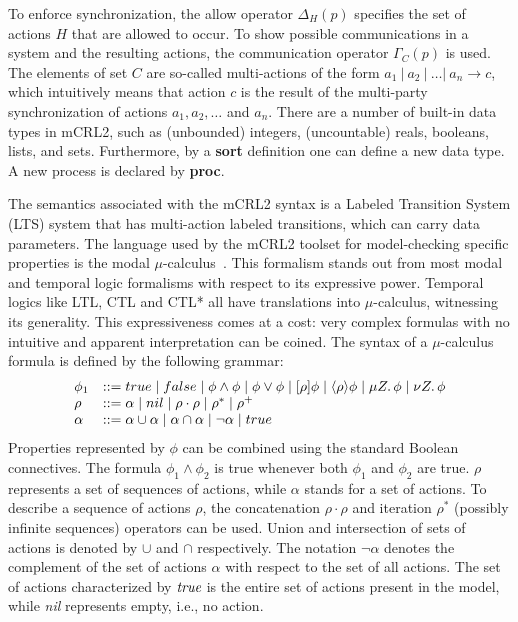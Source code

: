 \documentclass[letter]{llncs}
\begin{document}
To enforce synchronization, the allow operator ${\Delta_H(p)}$ specifies the set of actions $H$ that are allowed
to occur. To show possible communications in a system and the resulting actions, the communication operator
${\Gamma_C(p)}$ is used. The elements of set $C$ are so-called multi-actions of the form $a_1\ |\ a_2\ |\ \dots |\ a_n \rightarrow c$, which intuitively
means that action $c$ is the result of the multi-party synchronization of actions $a_1 , a_2 , \dots $ and $a_n$.
There are a number of built-in data types in mCRL2, such as (unbounded) integers, (uncountable)
reals, booleans, lists, and sets. 
Furthermore, by a \textbf{sort} definition one can define a new data type. A new process
is declared by \textbf{proc}.

The semantics associated with the mCRL2 syntax is a Labeled Transition System (LTS)
system that has multi-action labeled transitions, which can carry data parameters. The language used by the mCRL2
toolset for model-checking specific properties is the modal
$\mu$-calculus~\cite{Emerson97modelchecking}. This formalism stands out from most modal and temporal logic formalisms with respect to its
expressive power. Temporal logics like LTL, CTL and CTL* all have translations into $\mu$-calculus,
witnessing its generality. This expressiveness comes at a cost: very complex formulas with no intuitive and apparent interpretation can be coined. 
The syntax of a $\mu$-calculus formula is defined by the following grammar:
\[
\begin{array}{ll}

\phi_1 & ::= true \mid false \mid \phi\wedge\phi \mid \phi\vee\phi \mid [\rho]\phi \mid \langle\rho\rangle\phi \mid \mu Z\ldotp\phi \mid \nu Z\ldotp\phi \\
\rho & ::= \alpha \mid nil \mid \rho\cdot\rho \mid \rho^* \mid \rho^+ \\
\alpha & ::= \alpha\cup\alpha \mid \alpha\cap\alpha \mid\neg\alpha \mid true\\
\end{array}
\]
Properties represented by $\phi$ can be combined using the standard Boolean connectives.
The formula $\phi_1\wedge\phi_2$ is true whenever both $\phi_1$ and $\phi_2$ are true.
$\rho$ represents a set of sequences of actions, while $\alpha$ stands for a set of actions.
To describe a sequence of actions $\rho$, the concatenation $\rho\cdot\rho$ and iteration $\rho^*$ (possibly infinite sequences) operators can be used.
Union and intersection of sets of actions is denoted by $\cup$ and $\cap$ respectively. 
The notation $\neg\alpha$ denotes the complement of the set of actions $\alpha$ with respect to the set of all actions. 
The set of actions characterized by $\emph{true}$ is the entire set of actions present in the model, while \emph{nil} represents empty, i.e., no action.
\end{document}

